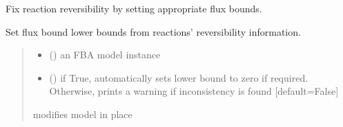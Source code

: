 \documentclass[letterpaper,12pt,english]{sphinxmanual}
\begin{document}

\begin{fulllineitems}
\label{\detokenize{api/core:cbmpy.CBTools.fixReversibility}}
\pysigstartsignatures
\pysiglinewithargsret
{}
{\sphinxparamcomma {}}
{}
\pysigstopsignatures
\sphinxAtStartPar
Fix reaction reversibility by setting appropriate flux bounds.

\sphinxAtStartPar
Set flux bound lower bounds from reactions’ reversibility information.
\begin{quote}\begin{description}
\begin{itemize}
\item {} 
\sphinxAtStartPar
{} () \textendash{} an FBA model instance

\item {} 
\sphinxAtStartPar
{} (\sphinxstyleliteralemphasis{\sphinxupquote{, }}) \textendash{} if True, automatically sets lower bound to zero if required.
Otherwise, prints a warning if inconsistency is found {[}default=False{]}

\end{itemize}

\sphinxAtStartPar
{} \textendash{} modifies model in place

\end{description}\end{quote}

\end{fulllineitems}

\end{document}
